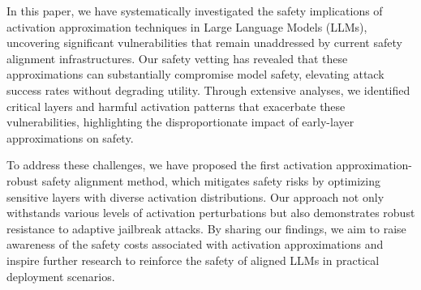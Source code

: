 In this paper, we have systematically investigated the safety implications of activation approximation techniques in Large Language Models (LLMs), uncovering significant vulnerabilities that remain unaddressed by current safety alignment infrastructures. Our safety vetting has revealed that these approximations can substantially compromise model safety, elevating attack success rates without degrading utility. Through extensive analyses, we identified critical layers and harmful activation patterns that exacerbate these vulnerabilities, highlighting the disproportionate impact of early-layer approximations on safety.

To address these challenges, we have proposed the first activation approximation-robust safety alignment method, which mitigates safety risks by optimizing sensitive layers with diverse activation distributions. Our approach not only withstands various levels of activation perturbations but also demonstrates robust resistance to adaptive jailbreak attacks. By sharing our findings, we aim to raise awareness of the safety costs associated with activation approximations and inspire further research to reinforce the safety of aligned LLMs in practical deployment scenarios.